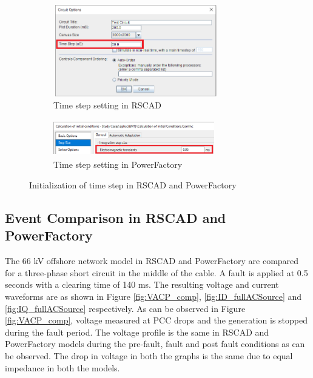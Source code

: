 \begin{figure}[H]
\centering
\begin{subfigure}{.55\textwidth}
  \centering
  \includegraphics[height=4cm,width=7.2cm]{Diagrams/Chapter_3/Stepsize_RSCAD.PNG}
  \caption{Time step setting in RSCAD}
  \label{Stepsize_RSCAD}
\end{subfigure}%
\begin{subfigure}{.45\textwidth}
  \centering
  \includegraphics[height=1.6cm,width=7cm]{Diagrams/Chapter_3/Stepsize_PFD_Zoom.PNG}
  \caption{Time step setting in PowerFactory}
  \label{Stepsize_PFD_Zoom}
\end{subfigure}
\caption{Initialization of time step in RSCAD and PowerFactory}
\label{fig:Stepsize_RSCAD_PFD}
\end{figure}

\subsection{Event Comparison in RSCAD and PowerFactory}
The 66 kV offshore network model in RSCAD and PowerFactory are compared for a three-phase short circuit in the middle of the cable. A fault is applied at 0.5 seconds with a clearing time of 140 ms. The resulting voltage and current waveforms are as shown in Figure \ref{fig:VACP_comp},  \ref{fig:ID_fullACSource} and \ref{fig:IQ_fullACSource} respectively. As can be observed in Figure \ref{fig:VACP_comp}, voltage measured at \gls{PCC} drops and the generation is stopped during the fault period. The voltage profile is the same in RSCAD and PowerFactory models during the pre-fault, fault and post fault conditions as can be observed. The drop in voltage in both the graphs is the same due to equal impedance in both the models. 

